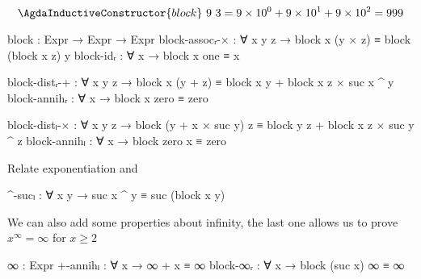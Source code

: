 \[\AgdaInductiveConstructor{block}\ 9\ 3 = 9 \times 10^0 + 9 \times 10^1 + 9 \times 10^2 = 999\]
\begin{code}
    block : Expr → Expr → Expr
    block-assocᵣ-× :
      ∀ x y z → block x (y × z) ≡ block (block x z) y
    block-idᵣ : ∀ x → block x one ≡ x

    block-distᵣ-+ :
      ∀ x y z →
      block x (y + z) ≡ block x y + block x z × suc x ^ y
    block-annihᵣ : ∀ x → block x zero ≡ zero

    block-distₗ-× :
      ∀ x y z →
      block (y + x × suc y) z ≡
      block y z + block x z × suc y ^ z
    block-annihₗ : ∀ x → block zero x ≡ zero
\end{code}
Relate exponentiation and 
\begin{code}
    ^-sucₗ : ∀ x y → suc x ^ y ≡ suc (block x y)
\end{code}
We can also add some properties about infinity, the last one allows us to prove $x^\infty = \infty$ for $x \ge 2$
\begin{code}
    ∞ : Expr
    +-annihₗ : ∀ x → ∞ + x ≡ ∞
    block-∞ᵣ : ∀ x → block (suc x) ∞ ≡ ∞
\end{code}
